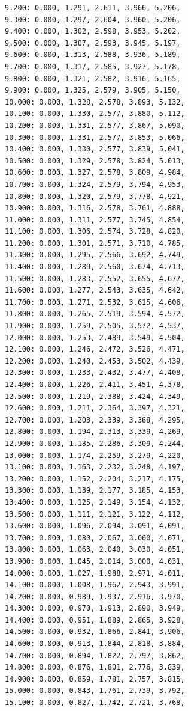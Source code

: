 \documentclass[12pt, a4paper]{article}
\begin{document}
\begin{scriptsize}
\begin{ttfamily}
\begin{lstlisting}
9.200: 0.000, 1.291, 2.611, 3.966, 5.206, 
9.300: 0.000, 1.297, 2.604, 3.960, 5.206, 
9.400: 0.000, 1.302, 2.598, 3.953, 5.202, 
9.500: 0.000, 1.307, 2.593, 3.945, 5.197, 
9.600: 0.000, 1.313, 2.588, 3.936, 5.189, 
9.700: 0.000, 1.317, 2.585, 3.927, 5.178, 
9.800: 0.000, 1.321, 2.582, 3.916, 5.165, 
9.900: 0.000, 1.325, 2.579, 3.905, 5.150, 
10.000: 0.000, 1.328, 2.578, 3.893, 5.132, 
10.100: 0.000, 1.330, 2.577, 3.880, 5.112, 
10.200: 0.000, 1.331, 2.577, 3.867, 5.090, 
10.300: 0.000, 1.331, 2.577, 3.853, 5.066, 
10.400: 0.000, 1.330, 2.577, 3.839, 5.041, 
10.500: 0.000, 1.329, 2.578, 3.824, 5.013, 
10.600: 0.000, 1.327, 2.578, 3.809, 4.984, 
10.700: 0.000, 1.324, 2.579, 3.794, 4.953, 
10.800: 0.000, 1.320, 2.579, 3.778, 4.921, 
10.900: 0.000, 1.316, 2.578, 3.761, 4.888, 
11.000: 0.000, 1.311, 2.577, 3.745, 4.854, 
11.100: 0.000, 1.306, 2.574, 3.728, 4.820, 
11.200: 0.000, 1.301, 2.571, 3.710, 4.785, 
11.300: 0.000, 1.295, 2.566, 3.692, 4.749, 
11.400: 0.000, 1.289, 2.560, 3.674, 4.713, 
11.500: 0.000, 1.283, 2.552, 3.655, 4.677, 
11.600: 0.000, 1.277, 2.543, 3.635, 4.642, 
11.700: 0.000, 1.271, 2.532, 3.615, 4.606, 
11.800: 0.000, 1.265, 2.519, 3.594, 4.572, 
11.900: 0.000, 1.259, 2.505, 3.572, 4.537, 
12.000: 0.000, 1.253, 2.489, 3.549, 4.504, 
12.100: 0.000, 1.246, 2.472, 3.526, 4.471, 
12.200: 0.000, 1.240, 2.453, 3.502, 4.439, 
12.300: 0.000, 1.233, 2.432, 3.477, 4.408, 
12.400: 0.000, 1.226, 2.411, 3.451, 4.378, 
12.500: 0.000, 1.219, 2.388, 3.424, 4.349, 
12.600: 0.000, 1.211, 2.364, 3.397, 4.321, 
12.700: 0.000, 1.203, 2.339, 3.368, 4.295, 
12.800: 0.000, 1.194, 2.313, 3.339, 4.269, 
12.900: 0.000, 1.185, 2.286, 3.309, 4.244, 
13.000: 0.000, 1.174, 2.259, 3.279, 4.220, 
13.100: 0.000, 1.163, 2.232, 3.248, 4.197, 
13.200: 0.000, 1.152, 2.204, 3.217, 4.175, 
13.300: 0.000, 1.139, 2.177, 3.185, 4.153, 
13.400: 0.000, 1.125, 2.149, 3.154, 4.132, 
13.500: 0.000, 1.111, 2.121, 3.122, 4.112, 
13.600: 0.000, 1.096, 2.094, 3.091, 4.091, 
13.700: 0.000, 1.080, 2.067, 3.060, 4.071, 
13.800: 0.000, 1.063, 2.040, 3.030, 4.051, 
13.900: 0.000, 1.045, 2.014, 3.000, 4.031, 
14.000: 0.000, 1.027, 1.988, 2.971, 4.011, 
14.100: 0.000, 1.008, 1.962, 2.943, 3.991, 
14.200: 0.000, 0.989, 1.937, 2.916, 3.970, 
14.300: 0.000, 0.970, 1.913, 2.890, 3.949, 
14.400: 0.000, 0.951, 1.889, 2.865, 3.928, 
14.500: 0.000, 0.932, 1.866, 2.841, 3.906, 
14.600: 0.000, 0.913, 1.844, 2.818, 3.884, 
14.700: 0.000, 0.894, 1.822, 2.797, 3.862, 
14.800: 0.000, 0.876, 1.801, 2.776, 3.839, 
14.900: 0.000, 0.859, 1.781, 2.757, 3.815, 
15.000: 0.000, 0.843, 1.761, 2.739, 3.792, 
15.100: 0.000, 0.827, 1.742, 2.721, 3.768, 

\end{lstlisting}
\end{ttfamily}
\end{scriptsize}
\end{document}
